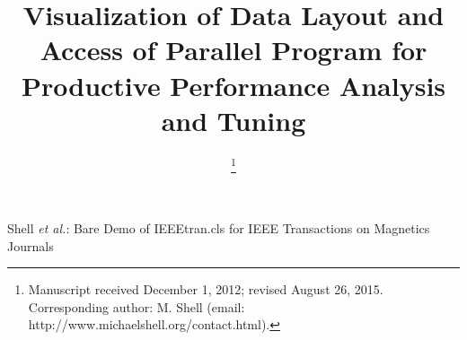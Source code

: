 \documentclass[journal,transmag]{IEEEtran}
\begin{document}
\title{Visualization of Data Layout and Access of Parallel Program for Productive Performance Analysis and Tuning}
\author{
\thanks{Manuscript received December 1, 2012; revised August 26, 2015. 
Corresponding author: M. Shell (email: http://www.michaelshell.org/contact.html).}}

%
{Shell \MakeLowercase{\textit{et al.}}: Bare Demo of IEEEtran.cls for IEEE Transactions on Magnetics Journals}


\maketitle

\IEEEdisplaynontitleabstractindextext
\IEEEpeerreviewmaketitle









%
%
%
%
%
%
\end{document}
